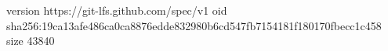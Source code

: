 version https://git-lfs.github.com/spec/v1
oid sha256:19ca13afe486ca0ca8876edde832980b6cd547fb7154181f180170fbecc1c458
size 43840
